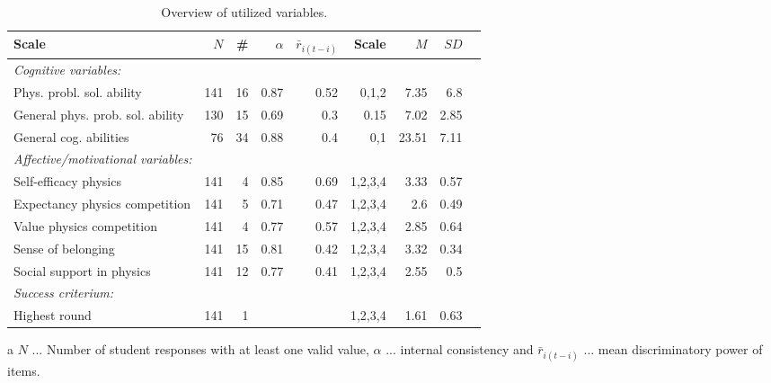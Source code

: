 \documentclass[D:/studies/WinnerS/Erhebungen/IPhO1718/paper/probsol_paper/main/TaylorFrancis/interactapasample]{subfiles}
\begin{document}
\begin{table}
\centering
\caption{Overview of utilized variables.}
\label{Tab1}
\begin{threeparttable}
\begin{tabular}{lrrrrrrrr}
\toprule
Scale & $N$ & \# & $\alpha$ & $\bar{r}_{i(t-i)}$ & Scale & $M$ & $SD$ \\ 
  \midrule
\textit{Cognitive variables:} &  &  &  &  &  &  &  \\ 
  Phys. probl. sol. ability & 141 & 16 & 0.87 & 0.52 & 0,1,2 & 7.35 & 6.8 \\ 
  General phys. prob. sol. ability & 130 & 15 & 0.69 & 0.3 & 0.15 & 7.02 & 2.85 \\ 
  General cog. abilities & 76 & 34 & 0.88 & 0.4 & 0,1 & 23.51 & 7.11 \\ 
  \midrule \textit{Affective/motivational variables:} &  &  &  &  &  &  &  \\ 
  Self-efficacy physics & 141 & 4 & 0.85 & 0.69 & 1,2,3,4 & 3.33 & 0.57 \\ 
  Expectancy physics competition & 141 & 5 & 0.71 & 0.47 & 1,2,3,4 & 2.6 & 0.49 \\ 
  Value physics competition & 141 & 4 & 0.77 & 0.57 & 1,2,3,4 & 2.85 & 0.64 \\ 
  Sense of belonging & 141 & 15 & 0.81 & 0.42 & 1,2,3,4 & 3.32 & 0.34 \\ 
  Social support in physics & 141 & 12 & 0.77 & 0.41 & 1,2,3,4 & 2.55 & 0.5 \\ 
  \midrule \textit{Success criterium:} &  &  &  &  &  &  &  \\ 
  Highest round & 141 & 1 &  &  & 1,2,3,4 & 1.61 & 0.63 \\ 
   \bottomrule\end{tabular}
\begin{tablenotes}
\item[a] $N$ ... Number of student responses with at least one valid value, $\alpha$ ... internal consistency and $\bar{r}_{i(t-i)}$ ... mean discriminatory power of items.
\end{tablenotes}
\end{threeparttable}
\end{table}
\end{document}
